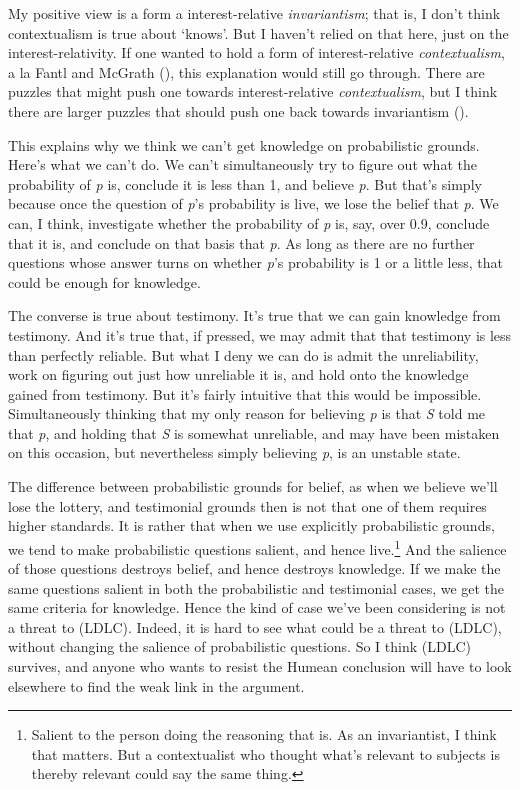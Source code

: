 \documentclass[
  10pt,
  letterpaper,
  DIV=11,
  numbers=noendperiod,
  twoside]{scrartcl}
\begin{document}
My positive view is a form a interest-relative \emph{invariantism}; that
is, I don't think contextualism is true about `knows'. But I haven't
relied on that here, just on the interest-relativity. If one wanted to
hold a form of interest-relative \emph{contextualism}, a la Fantl and
McGrath (), this explanation would
still go through. There are puzzles that might push one towards
interest-relative \emph{contextualism}, but I think there are larger
puzzles that should push one back towards invariantism
().

This explains why we think we can't get knowledge on probabilistic
grounds. Here's what we can't do. We can't simultaneously try to figure
out what the probability of \emph{p} is, conclude it is less than 1, and
believe \emph{p}. But that's simply because once the question of
\emph{p}'s probability is live, we lose the belief that \emph{p}. We
can, I think, investigate whether the probability of \emph{p} is, say,
over 0.9, conclude that it is, and conclude on that basis that \emph{p}.
As long as there are no further questions whose answer turns on whether
\emph{p}'s probability is 1 or a little less, that could be enough for
knowledge.

The converse is true about testimony. It's true that we can gain
knowledge from testimony. And it's true that, if pressed, we may admit
that that testimony is less than perfectly reliable. But what I deny we
can do is admit the unreliability, work on figuring out just how
unreliable it is, and hold onto the knowledge gained from testimony. But
it's fairly intuitive that this would be impossible. Simultaneously
thinking that my only reason for believing \emph{p} is that \emph{S}
told me that \emph{p}, and holding that \emph{S} is somewhat unreliable,
and may have been mistaken on this occasion, but nevertheless simply
believing \emph{p}, is an unstable state.

The difference between probabilistic grounds for belief, as when we
believe we'll lose the lottery, and testimonial grounds then is not that
one of them requires higher standards. It is rather that when we use
explicitly probabilistic grounds, we tend to make probabilistic
questions salient, and hence live.\footnote{Salient to the person doing
  the reasoning that is. As an invariantist, I think that matters. But a
  contextualist who thought what's relevant to subjects is thereby
  relevant could say the same thing.} And the salience of those
questions destroys belief, and hence destroys knowledge. If we make the
same questions salient in both the probabilistic and testimonial cases,
we get the same criteria for knowledge. Hence the kind of case we've
been considering is not a threat to (LDLC). Indeed, it is hard to see
what could be a threat to (LDLC), without changing the salience of
probabilistic questions. So I think (LDLC) survives, and anyone who
wants to resist the Humean conclusion will have to look elsewhere to
find the weak link in the argument.
\end{document}
